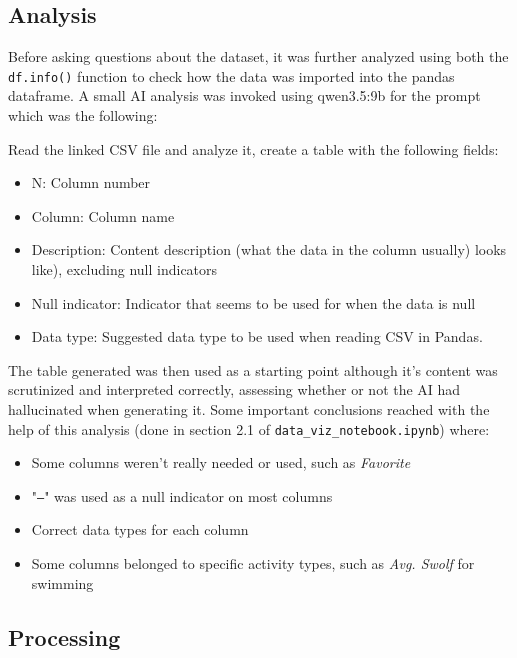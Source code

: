 \documentclass[a4paper,11pt]{article}
\begin{document}
\subsection{Analysis}

\par
Before asking questions about the dataset, it was further analyzed using both
the \texttt{df.info()} function to check how the data was imported into the
pandas dataframe. A small AI analysis was invoked using
qwen3.5:9b\autocite{qwen} for the prompt which was the following:

\begin{center}
	Read the linked CSV file and analyze it, create a table with the following
	fields:
	\begin{itemize}
		\item N: Column number
		\item Column: Column name
		\item Description: Content description (what the data in the column usually)
		      looks like), excluding null indicators
		\item Null indicator: Indicator that seems to be used for when the data is
		      null
		\item Data type: Suggested data type to be used when reading CSV in Pandas.
	\end{itemize}
\end{center}

\par
The table generated was then used as a starting point although it's content was
scrutinized and interpreted correctly, assessing whether or not the AI had
hallucinated when generating it. Some important conclusions reached with the
help of this analysis (done in section 2.1 of \texttt{data\_viz\_notebook.ipynb})
where:

\begin{itemize}
	\item Some columns weren't really needed or used, such as \textit{Favorite}
	\item "\texttt{--}" was used as a null indicator on most columns
	\item Correct data types for each column
	\item Some columns belonged to specific activity types, such as \textit{Avg.
		      Swolf} for swimming
\end{itemize}

\subsection{Processing}
\end{document}
